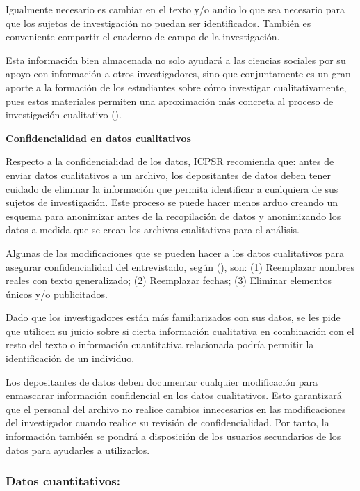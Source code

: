 \documentclass[
  spanish,
  a4paper,
  oneside]{scrbook}
\begin{document}
Igualmente necesario es cambiar en el texto y/o audio lo que sea
necesario para que los sujetos de investigación no puedan ser
identificados. También es conveniente compartir el cuaderno de campo de
la investigación.

Esta información bien almacenada no solo ayudará a las ciencias sociales
por su apoyo con información a otros investigadores, sino que
conjuntamente es un gran aporte a la formación de los estudiantes sobre
cómo investigar cualitativamente, pues estos materiales permiten una
aproximación más concreta al proceso de investigación cualitativo
().

\textbf{Confidencialidad en datos cualitativos}

Respecto a la confidencialidad de los datos, ICPSR recomienda que: antes
de enviar datos cualitativos a un archivo, los depositantes de datos
deben tener cuidado de eliminar la información que permita identificar a
cualquiera de sus sujetos de investigación. Este proceso se puede hacer
menos arduo creando un esquema para anonimizar antes de la recopilación
de datos y anonimizando los datos a medida que se crean los archivos
cualitativos para el análisis.

Algunas de las modificaciones que se pueden hacer a los datos
cualitativos para asegurar confidencialidad del entrevistado, según
(), son: (1)
Reemplazar nombres reales con texto generalizado; (2) Reemplazar fechas;
(3) Eliminar elementos únicos y/o publicitados.

Dado que los investigadores están más familiarizados con sus datos, se
les pide que utilicen su juicio sobre si cierta información cualitativa
en combinación con el resto del texto o información cuantitativa
relacionada podría permitir la identificación de un individuo.

Los depositantes de datos deben documentar cualquier modificación para
enmascarar información confidencial en los datos cualitativos. Esto
garantizará que el personal del archivo no realice cambios innecesarios
en las modificaciones del investigador cuando realice su revisión de
confidencialidad. Por tanto, la información también se pondrá a
disposición de los usuarios secundarios de los datos para ayudarles a
utilizarlos.

\subsubsection{Datos cuantitativos:}\label{datos-cuantitativos}
\end{document}
